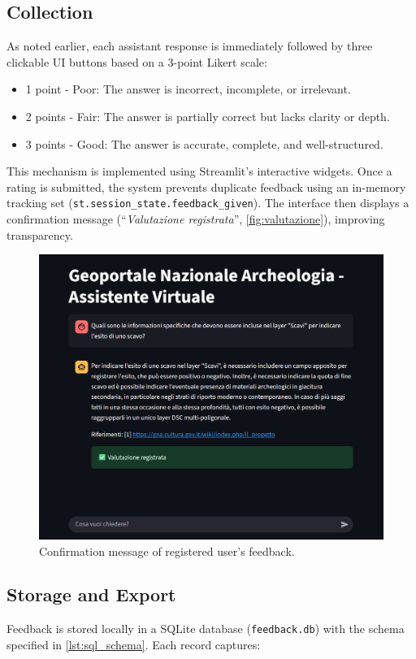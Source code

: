 \begin{spacing}{1.5}
\subsection{Collection}
As noted earlier, each assistant response is immediately followed by three clickable UI buttons based on a 3-point Likert scale:
\begin{itemize}
\item 1 point - Poor: The answer is incorrect, incomplete, or irrelevant.
\item 2 points - Fair: The answer is partially correct but lacks clarity or depth.
\item 3 points - Good: The answer is accurate, complete, and well-structured.
\end{itemize}

This mechanism is implemented using Streamlit’s interactive widgets. Once a rating is submitted, the system prevents duplicate feedback using an in-memory tracking set (\texttt{st.session\_state.feedback\_given}). The interface then displays a confirmation message (``\textit{Valutazione registrata}'', \autoref{fig:valutazione}), improving transparency.

\begin{figure}[H]
  \centering
  \includegraphics[width=\textwidth]{images/val_registrata.png} 
  \caption{Confirmation message of registered user's feedback.}
  \label{fig:valutazione}
\end{figure}

\subsection{Storage and Export}
Feedback is stored locally in a SQLite database (\texttt{feedback.db}) with the schema specified in \autoref{lst:sql_schema}. Each record captures:


\end{spacing}
